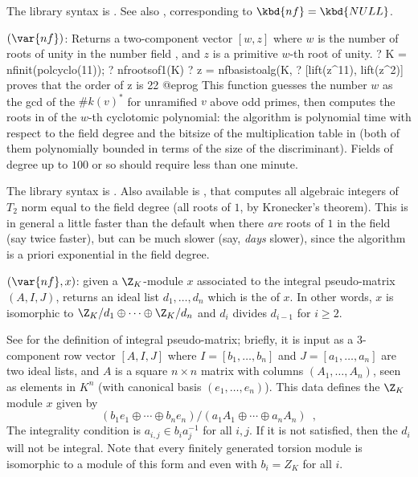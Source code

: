 The library syntax is .
See also ,
corresponding to $\kbd{nf} = \kbd{NULL}$.

$(\var{nf})$: \label{se:nfrootsof1}Returns a two-component vector $[w,z]$ where $w$ is the number of roots of
unity in the number field , and $z$ is a primitive $w$-th root
of unity.
\bprog
? K = nfinit(polcyclo(11));
? nfrootsof1(K)
? z = nfbasistoalg(K, %
? [lift(z^11), lift(z^2)]     \\ proves that the order of z is 22
@eprog
This function guesses the number $w$ as the gcd of the $\#k(v)^*$ for
unramified $v$ above odd primes, then computes the roots in 
of the $w$-th cyclotomic polynomial: the algorithm is polynomial time with
respect to the field degree and the bitsize of the multiplication table in
 (both of them polynomially bounded in terms of the size of the
discriminant). Fields of degree up to $100$ or so should require less than
one minute.

The library syntax is .
Also available is , that computes
all algebraic integers of $T_2$ norm equal to the field degree
(all roots of $1$, by Kronecker's theorem). This is in general a little
faster than the default when there \emph{are} roots of $1$ in the field
(say twice faster), but can be much slower (say, \emph{days} slower), since
the algorithm is a priori exponential in the field degree.

$(\var{nf},x)$: \label{se:nfsnf}given a $\Z_K$-module $x$ associated to the integral pseudo-matrix
$(A,I,J)$, returns an ideal list $d_1,\dots,d_n$ which is the  of $x$. In other words, $x$ is isomorphic to
$\Z_K/d_1\oplus\cdots\oplus\Z_K/d_n$ and $d_i$ divides $d_{i-1}$ for $i\ge2$.

See  for the definition of integral pseudo-matrix;
briefly, it is input as a 3-component row vector $[A,I,J]$ where
$I = [b_1,\dots,b_n]$ and $J = [a_1,\dots,a_n]$ are two ideal lists,
and $A$ is a square $n\times n$ matrix with columns $(A_1,\dots,A_n)$,
seen as elements in $K^n$ (with canonical basis $(e_1,\dots,e_n)$).
This data defines the $\Z_K$ module $x$ given by
$$ (b_1e_1\oplus\cdots\oplus b_ne_n) / (a_1A_1\oplus\cdots\oplus a_nA_n)
\enspace, $$
The integrality condition is $a_{i,j} \in b_i a_j^{-1}$ for all $i,j$. If it
is not satisfied, then the $d_i$ will not be integral. Note that every
finitely generated torsion module is isomorphic to a module of this form and
even with $b_i=Z_K$ for all $i$.

